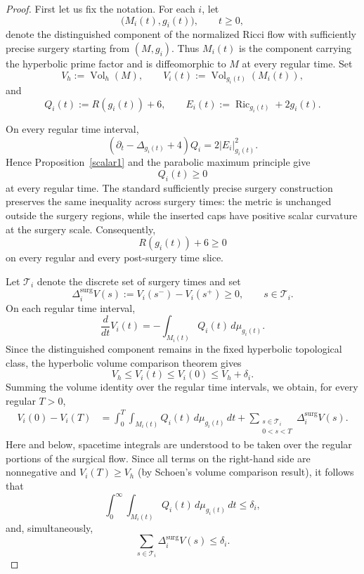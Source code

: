 \documentclass{amsart}
\begin{document}
\begin{proof}
First let us fix the notation. For each \(i\), let
\[
        \bigl(M_i(t),g_i(t)\bigr),\qquad t\geq0,
\]
denote the distinguished component of the normalized Ricci flow with
sufficiently precise surgery starting from \((M,g_i)\). Thus \(M_i(t)\)
is the component carrying the hyperbolic prime factor and is
diffeomorphic to \(M\) at every regular time. Set
\[
        V_h:=\operatorname{Vol}_h(M),
        \qquad
        V_i(t):=\operatorname{Vol}_{g_i(t)}(M_i(t)),
\]
and
\[
        Q_i(t):=R(g_i(t))+6,
        \qquad
        E_i(t):=\operatorname{Ric}_{g_i(t)}+2g_i(t).
\]

\noindent On every regular time interval,
\[
        (\partial_t-\Delta_{g_i(t)}+4)Q_i
        =
        2|E_i|_{g_i(t)}^2.
\]
Hence Proposition~\ref{scalar1} and the parabolic maximum principle give
\[
        Q_i(t)\geq0
\]
at every regular time. The standard sufficiently precise surgery
construction preserves the same inequality across surgery times: the
metric is unchanged outside the surgery regions, while the inserted
caps have positive scalar curvature at the surgery scale. Consequently,
\[
        R(g_i(t))+6\geq0
\]
on every regular and every post-surgery time slice.

\noindent Let \(\mathcal T_i\) denote the discrete set of surgery times and set
\[
        \Delta_i^{\mathrm{surg}}V(s)
        :=
        V_i(s^-)-V_i(s^+)\geq0,
        \qquad s\in\mathcal T_i.
\]
On each regular time interval,
\[
        \frac{d}{dt}V_i(t)
        =
        -\int_{M_i(t)}Q_i(t)\,d\mu_{g_i(t)}.
\]
Since the distinguished component remains in the fixed hyperbolic
topological class, the hyperbolic volume comparison theorem gives
\[
        V_h\leq V_i(t)\leq V_i(0)\leq V_h+\delta_i.
\]
Summing the volume identity over the regular time intervals, we obtain,
for every regular \(T>0\),
\[
\begin{aligned}
        V_i(0)-V_i(T)
        &=
        \int_0^T\int_{M_i(t)}
        Q_i(t)\,d\mu_{g_i(t)}\,dt
        +
        \sum_{\substack{s\in\mathcal T_i\\0<s<T}}
        \Delta_i^{\mathrm{surg}}V(s).
\end{aligned}
\]
Here and below, spacetime integrals are understood to be taken over the
regular portions of the surgical flow. Since all terms on the
right-hand side are nonnegative and \(V_i(T)\geq V_h\) (by Schoen's volume comparison result), it follows that
\begin{equation}
\label{eq:late-scalar-budget}
        \int_0^\infty\int_{M_i(t)}
        Q_i(t)\,d\mu_{g_i(t)}\,dt
        \leq\delta_i,
\end{equation}
and, simultaneously,
\[
        \sum_{s\in\mathcal T_i}
        \Delta_i^{\mathrm{surg}}V(s)
        \leq\delta_i.
\]


\end{proof}
\end{document}
